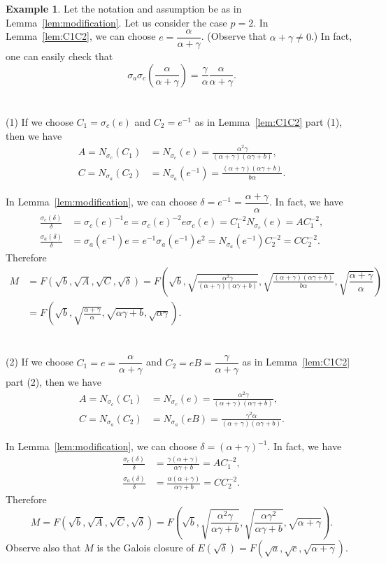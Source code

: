\documentclass[12pt,leqno]{amsart}
\theoremstyle{plain}
\theoremstyle{definition}
\newtheorem{ex}[thm]{Example}
\begin{document}
\begin{ex}
\label{ex:p=2}
  Let the notation and assumption be as in Lemma~\ref{lem:modification}.  Let us consider the case $p=2$. In Lemma~\ref{lem:C1C2}, we can choose $e=\dfrac{\alpha}{\alpha+\gamma}$. (Observe that $\alpha+\gamma\not=0$.) In fact, one can easily check that
\[
\sigma_a\sigma_c(\frac{\alpha}{\alpha+\gamma})=\frac{\gamma}{\alpha} \frac{\alpha}{\alpha+\gamma}.
\] 
\\
\\
(1) If we choose $C_1=\sigma_c(e)$ and  $C_2=e^{-1}$ as in Lemma~\ref{lem:C1C2} part (1), then  we have
\[
\begin{aligned}
A=N_{\sigma_c}(C_1)&=N_{\sigma_c}(e)= \frac{\alpha^2\gamma}{(\alpha+\gamma)(\alpha\gamma+b)},\\
C= N_{\sigma_a}(C_2)&=N_{\sigma_a}(e^{-1})=\frac{(\alpha+\gamma)(\alpha\gamma+b)}{b\alpha}.
\end{aligned}
\]

In Lemma~\ref{lem:modification}, we can choose $\delta=e^{-1}=\dfrac{\alpha+\gamma}{\alpha}$. In fact, we have
\[
\begin{aligned}
\frac{\sigma_c(\delta)}{\delta}&=\sigma_c(e)^{-1}e= \sigma_c(e)^{-2} e\sigma_c(e)= C_1^{-2} N_{\sigma_c}(e)= AC_1^{-2},\\
\frac{\sigma_a(\delta)}{\delta}&=\sigma_a(e^{-1})e= e^{-1}\sigma_a(e^{-1}) e^2= N_{\sigma_a}(e^{-1})C_2^{-2}= CC_2^{-2}.
\end{aligned}
\]
Therefore
\[
\begin{aligned}
M&= F(\sqrt{b},\sqrt{A},\sqrt{C},\sqrt{\delta})= F(\sqrt{b},\sqrt{ \frac{\alpha^2\gamma}{(\alpha+\gamma)(\alpha\gamma+b)}},\sqrt{\frac{(\alpha+\gamma)(\alpha\gamma+b)}{b\alpha}},\sqrt{\dfrac{\alpha+\gamma}{\alpha}})\\
&=F(\sqrt{b},\sqrt{\frac{\alpha+\gamma}{\alpha}},\sqrt{\alpha\gamma+b},\sqrt{\alpha\gamma}).
\end{aligned}
\]
\\
\\
(2) If we choose $C_1=e=\dfrac{\alpha}{\alpha+\gamma}$ and  $C_2=eB=\dfrac{\gamma}{\alpha+\gamma}$ as in Lemma~\ref{lem:C1C2} part (2), then  we have
\[
\begin{aligned}
A=N_{\sigma_c}(C_1)&=N_{\sigma_c}(e)= \frac{\alpha^2\gamma}{(\alpha+\gamma)(\alpha\gamma+b)},\\
C= N_{\sigma_a}(C_2)&=N_{\sigma_a}(eB)=\frac{\gamma^2\alpha}{(\alpha+\gamma)(\alpha\gamma+b)}.
\end{aligned}
\]

In Lemma~\ref{lem:modification}, we can choose $\delta=(\alpha+\gamma)^{-1}$. In fact, we have
\[
\begin{aligned}
\frac{\sigma_c(\delta)}{\delta}&=\frac{\gamma(\alpha+\gamma)}{\alpha\gamma+b}= AC_1^{-2},\\
\frac{\sigma_a(\delta)}{\delta}&=\frac{\alpha(\alpha+\gamma)}{\alpha\gamma+b}= CC_2^{-2}.
\end{aligned}
\]
Therefore
\[
M= F(\sqrt{b},\sqrt{A},\sqrt{C},\sqrt{\delta})= F(\sqrt{b},\sqrt{\frac{\alpha^2\gamma}{\alpha\gamma+b}},\sqrt{\frac{\alpha\gamma^2}{\alpha\gamma+b}},\sqrt{\alpha+\gamma}).
\]
Observe also that $M$ is  the Galois closure of $E(\sqrt{\delta})=F(\sqrt{a},\sqrt{c},\sqrt{\alpha+\gamma})$.
\end{ex}
\end{document}

